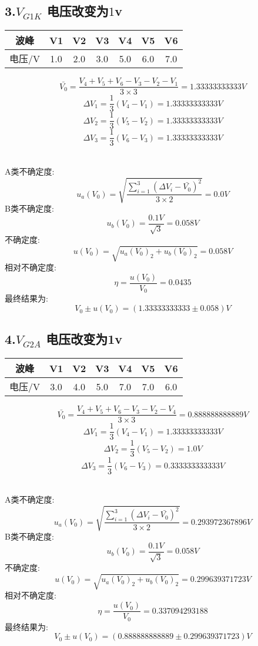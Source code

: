 \documentclass[11pt,a4paper,oneside]{article}
\begin{document}
\subsection*{3.$V_{G1K}$ 电压改变为$1$v}
\begin{center}
\begin{tabular}{|c|c|c|c|c|c|c|}
	\hline
	波峰&V1&V2&V3&V4&V5&V6
	\\\hline
	电压/V&1.0&2.0&3.0&5.0&6.0&7.0\\\hline
	\end{tabular}
	\end{center}

$$  \bar{V_0}=\frac{V_4+V_5+V_6-V_3-V_2-V_1}{3\times 3}=1.33333333333V $$
$$	\Delta V_1=\frac{1}{3}(V_4-V_1)=1.33333333333V $$
$$	\Delta V_2=\frac{1}{3}(V_5-V_2)=1.33333333333V $$
$$	\Delta V_3=\frac{1}{3}(V_6-V_3)=1.33333333333V $$ 

\ \\
A类不确定度:
$$	u_a(V_0)=\sqrt{\frac{\sum\limits_{i=1}^{3} (\Delta V_i-\bar{V_0})^2}{3\times 2}}=0.0V $$
B类不确定度:
$$	u_b(V_0)=\frac{0.1V}{\sqrt{3}}=0.058V $$
不确定度:
$$	u(V_0)=\sqrt{u_a(V_0)_2+u_b(V_0)_2}=0.058V $$
相对不确定度:
$$	\eta=\frac{u(V_0)}{V_0}=0.0435 $$
最终结果为:
$$	V_0 \pm u(V_0) = (1.33333333333 \pm 0.058)V $$


\subsection*{4.$V_{G2A}$ 电压改变为1v}
\begin{center}
\begin{tabular}{|c|c|c|c|c|c|c|}
	\hline
	波峰&V1&V2&V3&V4&V5&V6
	\\\hline
	电压/V&3.0&4.0&5.0&7.0&7.0&6.0\\\hline
	\end{tabular}
	\end{center}

$$  \bar{V_0}=\frac{V_4+V_5+V_6-V_3-V_2-V_4}{3\times 3}=0.888888888889V $$
$$	\Delta V_1=\frac{1}{3}(V_4-V_1)=1.33333333333V $$
$$	\Delta V_2=\frac{1}{3}(V_5-V_2)=1.0V $$
$$	\Delta V_3=\frac{1}{3}(V_6-V_3)=0.333333333333V $$ 

\ \\
A类不确定度:
$$	u_a(V_0)=\sqrt{\frac{\sum\limits_{i=1}^{3} (\Delta V_i-\bar{V_0})^2}{3\times 2}}=0.293972367896V $$
B类不确定度:
$$	u_b(V_0)=\frac{0.1V}{\sqrt{3}}=0.058V $$
不确定度:
$$	u(V_0)=\sqrt{u_a(V_0)_2+u_b(V_0)_2}=0.299639371723V $$
相对不确定度:
$$	\eta=\frac{u(V_0)}{V_0}=0.337094293188 $$
最终结果为:
$$	V_0 \pm u(V_0) = (0.888888888889 \pm 0.299639371723)V $$
\end{document}
